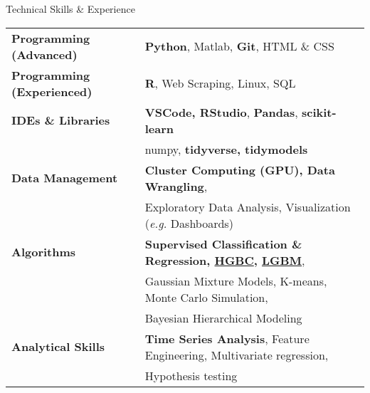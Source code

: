 \documentclass{resume} %
\begin{document}

\begin{rSection}{Technical Skills \& Experience}

\begin{small}

\begin{tabular}{ @{} >{\bfseries}l @{\hspace{6ex}} l }
Programming (Advanced)    & \textbf{Python}, Matlab, \textbf{Git}, HTML \& CSS \\ 
Programming (Experienced) & \textbf{R}, Web Scraping, Linux, SQL \\
IDEs \& Libraries         & \textbf{VSCode, RStudio}, \textbf{Pandas}, \textbf{scikit-learn} \\ & numpy, \textbf{tidyverse, tidymodels}\\
Data Management           & \textbf{Cluster Computing (GPU), Data Wrangling}, \\ & Exploratory Data Analysis, Visualization (\emph{e.g.} Dashboards) \\
Algorithms                & \textbf{Supervised Classification \& Regression, \href{https://scikit-learn.org/stable/modules/generated/sklearn.ensemble.HistGradientBoostingClassifier.html}{HGBC}, \href{https://lightgbm.readthedocs.io/en/latest/}{LGBM}}, \\ & Gaussian Mixture Models, K-means, Monte Carlo Simulation, \\ & Bayesian Hierarchical Modeling \\
Analytical Skills         & \textbf{Time Series Analysis}, Feature Engineering, Multivariate regression, \\ & Hypothesis testing \\
\end{tabular}

\end{small}

\end{rSection}

\end{document}
